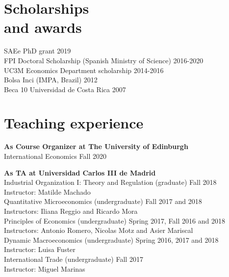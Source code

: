 \documentclass[margin]{res} %
\begin{document}
\begin{resume}
\section{Scholarships \\ and awards} 

SAEe PhD grant \hfill 2019\\
FPI Doctoral Scholarship (Spanish Ministry of Science) \hfill 2016-2020 \\
UC3M Economics Department scholarship \hfill 2014-2016 \\
Bolsa Inci (IMPA, Brazil) \hfill 2012 \\
Beca 10 Universidad de Costa Rica \hfill 2007


\section{Teaching experience}

{\bf As Course Organizer at The University of Edinburgh} \\
International Economics \hfill Fall 2020

{\bf As TA at Universidad Carlos III de Madrid} \\
Industrial Organization I: Theory and Regulation (graduate) \hfill Fall 2018 \\
Instructor: Matilde Machado \\
Quantitative Microeconomics (undergraduate) \hfill Fall 2017 and 2018 \\
Instructors: Iliana Reggio and Ricardo Mora \\
Principles of Economics (undergraduate) \hfill Spring 2017, Fall 2016 and 2018 \\
Instructors: Antonio Romero, Nicolas Motz and Asier Mariscal \\
Dynamic Macroeconomics (undergraduate) \hfill Spring 2016, 2017 and 2018 \\
Instructor: Luisa Fuster \\
International Trade (undergraduate) \hfill Fall 2017 \\ 
Instructor: Miguel Marinas 

%


\end{resume}
\end{document}
